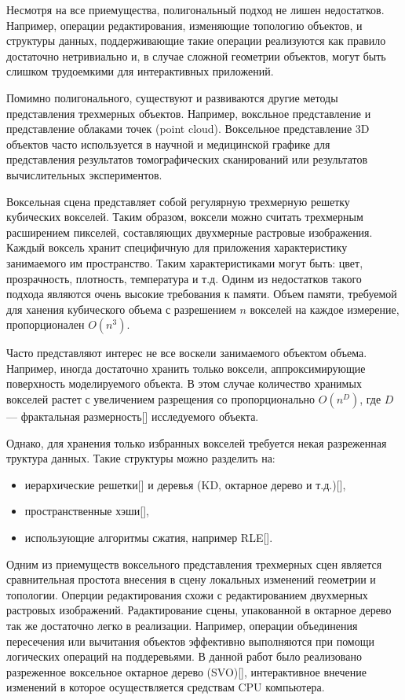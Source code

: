 \documentclass[a4paper,14pt]{extreport}
\begin{document}
Несмотря на все приемущества, полигональный подход не лишен недостатков. Например, операции редактирования, изменяющие топологию объектов, и структуры данных, поддерживающие такие операции реализуются как правило достаточно нетривиально и, в случае сложной геометрии объектов, могут быть слишком трудоемкими для интерактивных приложений.

Помимно полигонального, существуют и развиваются другие методы представления трехмерных объектов. Например, воксльное представление и представление облаками точек (point cloud). Воксельное представление 3D объектов часто используется в научной и медицинской графике для представления результатов томографических сканирований или результатов вычислительных экспериментов.

Воксельная сцена представляет собой регулярную трехмерную решетку кубических вокселей. Таким образом, воксели можно считать трехмерным расширением пикселей, составляющих двухмерные растровые изображения. Каждый воксель хранит специфичную для приложения характеристику занимаемого им пространство. Таким характеристиками могут быть: цвет, прозрачность, плотность, температура и т.д. Одинм из недостатков такого подхода являются очень высокие требования к памяти. Объем памяти, требуемой для ханения кубического объема с разрешением $n$ вокселей на каждое измерение, пропорционален $O(n^3)$.

Часто представляют интерес не все воскели занимаемого объектом объема. Например, иногда достаточно хранить только воксели, аппроксимирующие поверхность моделируемого объекта. В этом случае количество хранимых вокселей растет с увеличением разрещения со пропорционально $O(n^D)$, где $D$ --- фрактальная размерность[] исследуемого объекта.

Однако, для хранения только избранных вокселей требуется некая разреженная труктура данных. Такие структуры можно разделить на:
\begin{itemize}
\item иерархические решетки[] и деревья (KD, октарное дерево и т.д.)[],
\item пространственные хэши[],
\item использующие алгоритмы сжатия, например RLE[].
\end{itemize}

Одним из приемуществ воксельного представления трехмерных сцен является сравнительная простота внесения в сцену локальных изменений геометрии и топологии. Оперции редактирования схожи с редактированием двухмерных растровых изображений. Радактирование сцены, упакованной в октарное дерево так же достаточно легко в реализации. Например, операции объединения пересечения или вычитания объектов эффективно выполняются при помощи логических операций на поддеревьями. В данной работ было реализовано разреженное воксельное октарное дерево (SVO)[], интерактивное внечение изменений в которое осуществляется средствам CPU компьютера.
\end{document}

